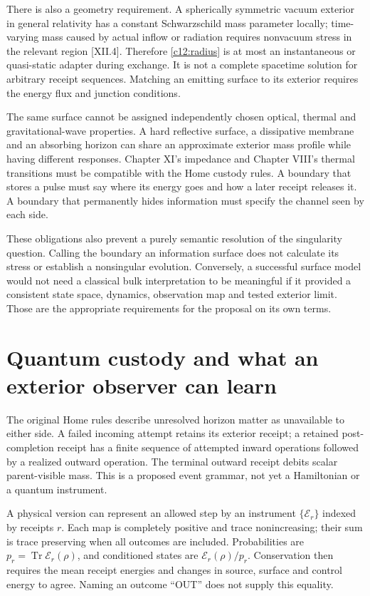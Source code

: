 There is also a geometry requirement. A spherically symmetric vacuum exterior in general relativity has a constant Schwarzschild mass parameter locally; time-varying mass caused by actual inflow or radiation requires nonvacuum stress in the relevant region [XII.4]. Therefore \eqref{c12:radius} is at most an instantaneous or quasi-static adapter during exchange. It is not a complete spacetime solution for arbitrary receipt sequences. Matching an emitting surface to its exterior requires the energy flux and junction conditions.

The same surface cannot be assigned independently chosen optical, thermal and gravitational-wave properties. A hard reflective surface, a dissipative membrane and an absorbing horizon can share an approximate exterior mass profile while having different responses. Chapter XI's impedance and Chapter VIII's thermal transitions must be compatible with the Home custody rules. A boundary that stores a pulse must say where its energy goes and how a later receipt releases it. A boundary that permanently hides information must specify the channel seen by each side.

These obligations also prevent a purely semantic resolution of the singularity question. Calling the boundary an information surface does not calculate its stress or establish a nonsingular evolution. Conversely, a successful surface model would not need a classical bulk interpretation to be meaningful if it provided a consistent state space, dynamics, observation map and tested exterior limit. Those are the appropriate requirements for the proposal on its own terms.

\section{Quantum custody and what an exterior observer can learn}
The original Home rules describe unresolved horizon matter as unavailable to either side. A failed incoming attempt retains its exterior receipt; a retained post-completion receipt has a finite sequence of attempted inward operations followed by a realized outward operation. The terminal outward receipt debits scalar parent-visible mass. This is a proposed event grammar, not yet a Hamiltonian or a quantum instrument.

A physical version can represent an allowed step by an instrument $\{\mathcal E_r\}$ indexed by receipts $r$. Each map is completely positive and trace nonincreasing; their sum is trace preserving when all outcomes are included. Probabilities are $p_r=\operatorname{Tr}\mathcal E_r(\rho)$, and conditioned states are $\mathcal E_r(\rho)/p_r$. Conservation then requires the mean receipt energies and changes in source, surface and control energy to agree. Naming an outcome ``OUT'' does not supply this equality.

